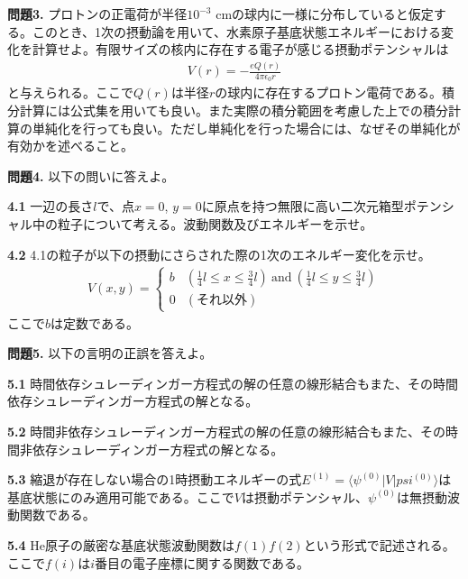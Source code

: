 \documentclass[11pt,pra,aps]{revtex4}
\begin{document}
\noindent
{\bf 問題3.} プロトンの正電荷が半径$10^{-3}$ cmの球内に一様に分布していると仮定する。このとき、1次の摂動論を用いて、水素原子基底状態エネルギーにおける変化を計算せよ。有限サイズの核内に存在する電子が感じる摂動ポテンシャルは
\begin{align}
  V(r) = -\frac{eQ(r)}{4\pi\epsilon_0 r}
\end{align}
と与えられる。ここで$Q(r)$は半径$r$の球内に存在するプロトン電荷である。積分計算には公式集を用いても良い。また実際の積分範囲を考慮した上での積分計算の単純化を行っても良い。ただし単純化を行った場合には、なぜその単純化が有効かを述べること。

\noindent
{\bf 問題4.} 以下の問いに答えよ。

\noindent
{\bf 4.1} 一辺の長さ$l$で、点$x=0$, $y=0$に原点を持つ無限に高い二次元箱型ポテンシャル中の粒子について考える。波動関数及びエネルギーを示せ。
    
\noindent
{\bf 4.2} 4.1の粒子が以下の摂動にさらされた際の1次のエネルギー変化を示せ。
\begin{align}
  V(x,y) = \left\{
  \begin{array}{ll}
    b & (\frac{1}{4}l\leq x\leq\frac{3}{4}l) \ \text{and}\ (\frac{1}{4}l\leq y\leq\frac{3}{4}l) \\
    0 & (\text{それ以外})
  \end{array}
  \right.
\end{align}
ここで$b$は定数である。

\noindent
{\bf 問題5.} 以下の言明の正誤を答えよ。
    
\noindent
{\bf 5.1} 時間依存シュレーディンガー方程式の解の任意の線形結合もまた、その時間依存シュレーディンガー方程式の解となる。

\noindent
{\bf 5.2} 時間非依存シュレーディンガー方程式の解の任意の線形結合もまた、その時間非依存シュレーディンガー方程式の解となる。

\noindent
{\bf 5.3} 縮退が存在しない場合の1時摂動エネルギーの式$E^{(1)}=\langle\psi^{(0)}|V|psi^{(0)}\rangle$は基底状態にのみ適用可能である。ここで$V$は摂動ポテンシャル、$\psi^{(0)}$は無摂動波動関数である。

\noindent
{\bf 5.4} He原子の厳密な基底状態波動関数は$f(1)f(2)$という形式で記述される。ここで$f(i)$は$i$番目の電子座標に関する関数である。
    
\end{document}

